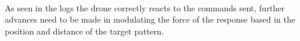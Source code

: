 \documentclass[11pt,twoside,a4paper]{article}
\begin{document}
\paragraph{} As seen in the logs the drone correctly reacts to the commands
sent, further advances need to be made in modulating the force of the response
based in the position and distance of the target pattern.
\end{document}
